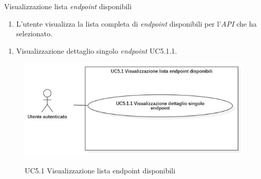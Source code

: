 \begin{usecase}{5.1}{Visualizzazione lista \textit{endpoint} disponibili}\label{uc:visualizzazione-lista-endpoint-disponibili}

    \usecasemain{}
        \begin{enumerate}
            \item L'utente visualizza la lista completa di \textit{endpoint} disponibili per l'\textit{API} che ha selezionato.
        \end{enumerate}

        \begin{enumerate}
            \item Visualizzazione dettaglio singolo \textit{endpoint} UC5.1.1.
        \end{enumerate}

\end{usecase}

\begin{figure}[!ht] 
    \centering 
    \includegraphics[width=\columnwidth, alt={Caso d'uso relativo al visualizzazione della lista di endpoint disponibili}]{images/usecase/UC5.1.jpg}
    \caption{UC5.1 Visualizzazione lista endpoint disponibili}\label{fig:uc:visualizzazione-lista-endpoint-disponibili}
  \end{figure}
  \pagebreak


